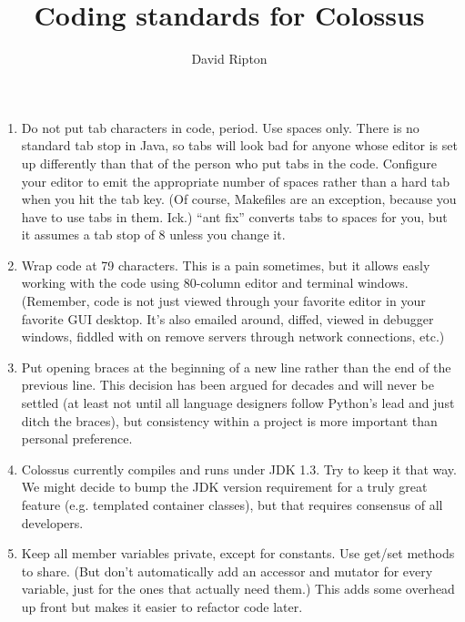 \documentclass{article}
\begin{document}

\title{Coding standards for Colossus}

\author{David Ripton}

\maketitle

\begin{enumerate}

\item Do not put tab characters in code, period. Use spaces only.
There is no standard tab stop in Java, so tabs will look bad for
anyone whose editor is set up differently than that of the person
who put tabs in the code. Configure your editor to emit the
appropriate number of spaces rather than a hard tab when you hit
the tab key. (Of course, Makefiles are an exception, because
you have to use tabs in them. Ick.) ``ant fix'' converts tabs
to spaces for you, but it assumes a tab stop of 8 unless you
change it.

\item Wrap code at 79 characters. This is a pain sometimes, but it
allows easly working with the code using 80-column editor and
terminal windows. (Remember, code is not just viewed through
your favorite editor in your favorite GUI desktop. It's also
emailed around, diffed, viewed in debugger windows, fiddled with
on remove servers through network connections, etc.)

\item Put opening braces at the beginning of a new line rather than
the end of the previous line. This decision has been argued for
decades and will never be settled (at least not until all language
designers follow Python's lead and just ditch the braces), but
consistency within a project is more important than personal
preference.

\item Colossus currently compiles and runs under JDK 1.3. Try to
keep it that way. We might decide to bump the JDK version requirement 
for a truly great feature (e.g. templated container classes), but 
that requires consensus of all developers.

\item Keep all member variables private, except for constants.
Use get/set methods to share. (But don't automatically add 
an accessor and mutator for every variable, just for the ones 
that actually need them.) This adds some overhead up front 
but makes it easier to refactor code later.


\end{enumerate}
\end{document}
